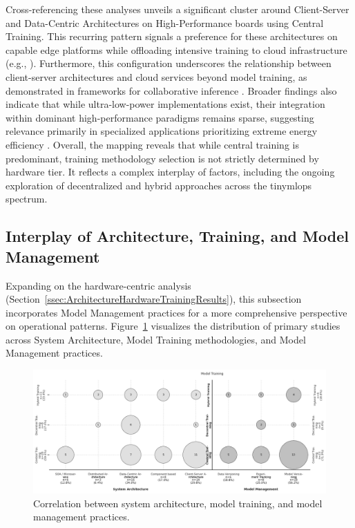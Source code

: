 Cross-referencing these analyses unveils a significant cluster around Client-Server and Data-Centric Architectures on High-Performance boards using Central Training. This recurring pattern signals a preference for these architectures on capable edge platforms while offloading intensive training to cloud infrastructure (e.g., \cite{banburyEdgeImpulseMLOps2023}). Furthermore, this configuration underscores the relationship between client-server architectures and cloud services beyond model training, as demonstrated in frameworks for collaborative inference \cite{antoniniTinyMLOpsFrameworkOrchestrating2022}. Broader findings also indicate that while ultra-low-power implementations exist, their integration within dominant high-performance paradigms remains sparse, suggesting relevance primarily in specialized applications prioritizing extreme energy efficiency \cite{pavanTyBoxAutomaticDesign2024}.
Overall, the mapping reveals that while central training is predominant, training methodology selection is not strictly determined by hardware tier. It reflects a complex interplay of factors, including the ongoing exploration of decentralized and hybrid approaches across the \gls{tinymlops} spectrum.

\subsection{Interplay of Architecture, Training, and Model Management}
\label{ssec:ArchitectureTrainingManagementResults}

Expanding on the hardware-centric analysis (Section~\ref{ssec:ArchitectureHardwareTrainingResults}), this subsection incorporates Model Management practices for a more comprehensive perspective on operational patterns. Figure~\ref{fig:bubble-chart-arch-training-mgmt} visualizes the distribution of primary studies across System Architecture, Model Training methodologies, and Model Management practices.

\begin{figure}[htbp]
    \centering
    \includegraphics[width=1\textwidth]{figs/research_results/sms_archi-training-lcm.png}
    \caption[Mapping of System Architecture, Training, and Management]{Correlation between system architecture, model training, and model management practices.}
    \label{fig:bubble-chart-arch-training-mgmt}
\end{figure}

